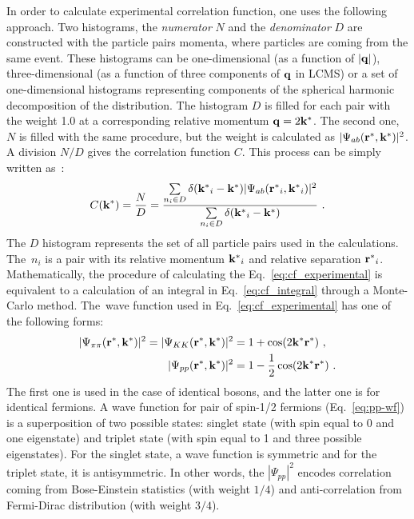     In order to calculate experimental correlation function, one uses the following approach.
    Two histograms, the \textit{numerator} $N$ and the \textit{denominator} $D$ are constructed with the particle pairs momenta, where particles are coming from the same event.
    These histograms can be one-dimensional (as a function of $|\mathbf{q}|$), three-dimensional (as a function of three components of $\mathbf{q}$ in LCMS) or a set of one-dimensional histograms representing components of the spherical harmonic decomposition of the distribution.
    The histogram $D$ is filled for each pair with the weight 1.0 at a corresponding relative momentum $\mathbf{q} = 2 \mathbf{k^*}$.
    The second one, $N$ is filled with the same procedure, but the weight is calculated as $|\Psi_{ab}(\mathbf{r^*},\mathbf{k^*})|^2$.
    A division $N/D$ gives the correlation function $C$.
    This process can be simply written as~\cite{nonidfemto}:
    \begin{equation}
      \label{eq:cf_experimental}
      C(\mathbf{k^*}) = \frac{N}{D} =  \frac{\sum\limits_{n_i \in D} \delta(\mathbf{k^*}_i - \mathbf{k^*}) |\Psi_{ab}(\mathbf{r^*}_i,\mathbf{k^*}_i)|^2 }{\sum\limits_{n_i \in D} \delta(\mathbf{k^*}_i - \mathbf{k^*})}~.
    \end{equation}
    The $D$ histogram represents the set of all particle pairs used in the calculations.
    The~$n_i$ is a pair with its relative momentum $\mathbf{k^*}_i$ and relative separation $\mathbf{r^*}_i$.
    Mathematically, the procedure of calculating the Eq.~\ref{eq:cf_experimental} is equivalent to a calculation of an integral in Eq.~\ref{eq:cf_integral} through a Monte-Carlo method.
    The~wave function used in Eq.~\ref{eq:cf_experimental} has one of the following forms:
    \begin{align}
      |\Psi_{\pi\pi}(\mathbf{r^*},\mathbf{k^*})|^2 = |\Psi_{KK}(\mathbf{r^*},\mathbf{k^*})|^2 &= 1 + \cos(2 \mathbf{k^*} \mathbf{r^*})~, \\
      \label{eq:pp-wf}
      |\Psi_{pp}(\mathbf{r^*},\mathbf{k^*})|^2 &= 1 - \frac{1}{2} \cos(2 \mathbf{k^*} \mathbf{r^*})~.
    \end{align}
    The first one is used in the case of identical bosons, and the latter one is for identical fermions.
    A wave function for pair of spin-1/2 fermions (Eq.~\ref{eq:pp-wf}) is a superposition of two possible states: singlet state (with spin equal to 0 and one eigenstate) and triplet state (with spin equal to 1 and three possible eigenstates).
    For the singlet state, a wave function is symmetric and for the triplet state, it is antisymmetric.
    In other words, the $|\Psi_{pp}|^2$ encodes correlation coming from Bose-Einstein statistics (with weight $1/4$) and anti-correlation from Fermi-Dirac distribution (with weight $3/4$).

